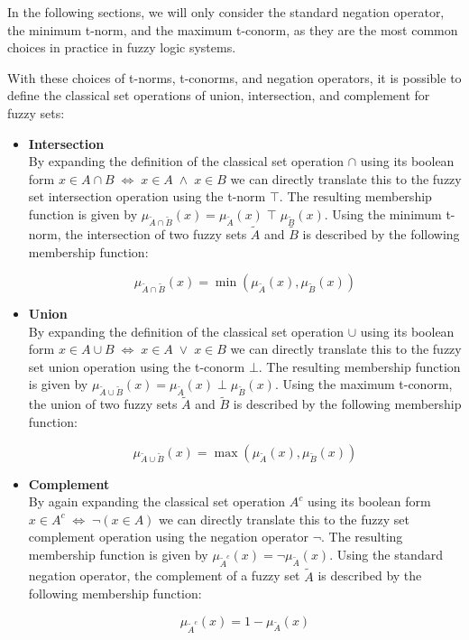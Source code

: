 In the following sections, we will only consider the standard negation operator, the minimum t-norm, and the maximum t-conorm, as they are the most common choices in practice in fuzzy logic systems.

With these choices of t-norms, t-conorms, and negation operators, it is possible to define the classical set operations of union, intersection, and complement for fuzzy sets:


\begin{itemize}

      \item \textbf{Intersection} \\
            By expanding the definition of the classical set operation $\cap$ using its boolean form $x \in A \cap B \; \iff \; x \in A \; \land \; x \in B$ we can directly translate this to the fuzzy set intersection operation using the t-norm $\top$. The resulting membership function is given by $\mu_{\tilde{A} \cap \tilde{B}}(x) = \mu_{\tilde{A}}(x) \; \top \; \mu_{\tilde{B}}(x)$. Using the minimum t-norm, the intersection of two fuzzy sets $\tilde{A}$ and $\tilde{B}$ is described by the following membership function:

            \begin{equation*}
                  \mu_{\tilde{A} \cap \tilde{B}}(x) = \min(\mu_{\tilde{A}}(x), \mu_{\tilde{B}}(x))
            \end{equation*}


      \item \textbf{Union} \\
            By expanding the definition of the classical set operation $\cup$ using its boolean form $x \in A \cup B \; \iff \; x \in A \; \lor \; x \in B$ we can directly translate this to the fuzzy set union operation using the t-conorm $\bot$. The resulting membership function is given by $\mu_{\tilde{A} \cup \tilde{B}}(x) = \mu_{\tilde{A}}(x) \;\bot \; \mu_{\tilde{B}}(x)$. Using the maximum t-conorm, the union of two fuzzy sets $\tilde{A}$ and $\tilde{B}$ is described by the following membership function:

            \begin{equation*}
                  \mu_{\tilde{A} \cup \tilde{B}}(x) = \max(\mu_{\tilde{A}}(x), \mu_{\tilde{B}}(x))
            \end{equation*}

      \item \textbf{Complement} \\
            By again expanding the classical set operation $A^c$ using its boolean form $x \in A^c \; \iff \; \neg (x \in A)$ we can directly translate this to the fuzzy set complement operation using the negation operator $\neg$. The resulting membership function is given by $\mu_{ \tilde{A}^c}(x) = \neg \mu_{\tilde{A}}(x)$. Using the standard negation operator, the complement of a fuzzy set $\tilde{A}$ is described by the following membership function:

            \begin{equation*}
                  \mu_{ \tilde{A}^c}(x) = 1 - \mu_{\tilde{A}}(x)
            \end{equation*}
\end{itemize}

